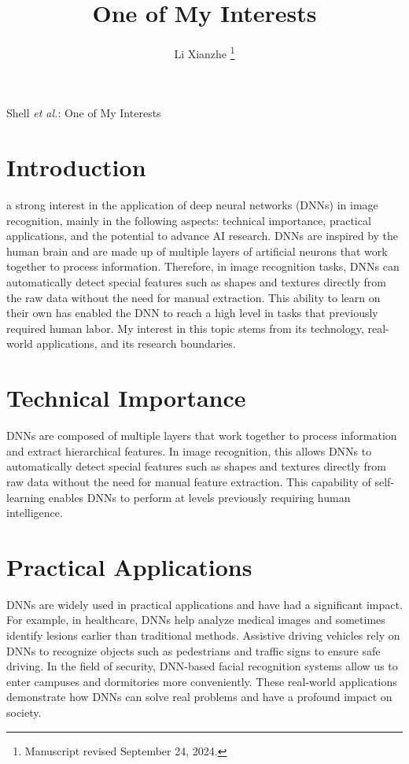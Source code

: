 \documentclass[a4paper,journal]{IEEEtran}
\begin{document}
\title{One of My Interests}

\author{Li Xianzhe
\thanks{Manuscript revised September 24, 2024.}}

%
{Shell \MakeLowercase{\textit{et al.}}: One of My Interests}

\maketitle

\section{Introduction}
 a strong interest in the application of deep neural networks (DNNs) in image recognition, mainly in the following aspects: technical importance, practical applications, and the potential to advance AI research. DNNs are inspired by the human brain and are made up of multiple layers of artificial neurons that work together to process information. Therefore, in image recognition tasks, DNNs can automatically detect special features such as shapes and textures directly from the raw data without the need for manual extraction. 
This ability to learn on their own has enabled the DNN to reach a high level in tasks that previously required human labor. My interest in this topic stems from its technology, real-world applications, and its research boundaries.


\section{Technical Importance}
DNNs are composed of multiple layers that work together to process information and extract hierarchical features. In image recognition, this allows DNNs to automatically detect special features such as shapes and textures directly from raw data without the need for manual feature extraction. This capability of self-learning enables DNNs to perform at levels previously requiring human intelligence.

\section{Practical Applications}
DNNs are widely used in practical applications and have had a significant impact. For example, in healthcare, DNNs help analyze medical images and sometimes identify lesions earlier than traditional methods. Assistive driving vehicles rely on DNNs to recognize objects such as pedestrians and traffic signs to ensure safe driving. In the field of security, DNN-based facial recognition systems allow us to enter campuses and dormitories more conveniently. These real-world applications demonstrate how DNNs can solve real problems and have a profound impact on society.
\end{document}
